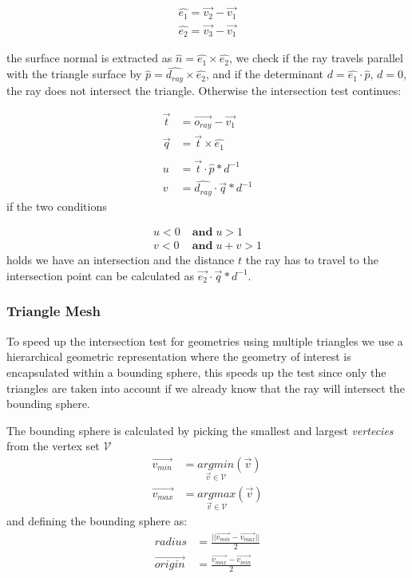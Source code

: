 \documentclass[a4paper, twocolumn]{article}
\begin{document}
\begin{align*}
    \hat{e_1} = \vec{v_2} - \vec{v_1} \\
    \hat{e_2} = \vec{v_3} - \vec{v_1}
\end{align*}

the surface normal is extracted as \( \hat{n} =\hat{e_1} \times \hat{e_2} \), we check if the ray travels parallel with the triangle surface by \(\hat{p} = \hat{d_{ray}} \times \hat{e_2}\), and if the determinant  \(d = \hat{e_1} \cdot \hat{p}\), \(d = 0 \), the ray does not intersect the triangle. Otherwise the intersection test continues:

\begin{align*}
    \vec{t} &= \vec{o_{ray}} - \vec{v_1} \\
    \vec{q} &= \vec{t} \times \hat{e_1} \\\\
    u &= \vec{t} \cdot \hat{p} * d^{-1} \\
    v &= \hat{d_{ray}} \cdot \vec{q} * d^{-1}
\end{align*} 
if the two conditions
 
\begin{align*}
    u < 0 \; &\textbf{and} \; u > 1 \\
    v < 0 \; &\textbf{and}  \; u + v > 1 
\end{align*}
holds we have an intersection and the distance \(t\) the ray has to travel to the intersection point can be calculated as \(\vec{e_2} \cdot \vec{q} * d^{-1} \).

        
        \subsubsection{Triangle Mesh} \label{sec:triangle_mesh}
        
        To speed up the intersection test for geometries using multiple triangles we use a hierarchical geometric representation where the geometry of interest is encapsulated within a bounding sphere, this speeds up the test since only the triangles are taken into account if we already know that the ray will intersect the bounding sphere.

    The bounding sphere is calculated by picking the smallest and largest \textit{vertecies} from the vertex set \(\mathcal{V}\)
    \begin{align*} 
        \vec{v_{min}} &= \underset{\vec{v} \in \mathcal{V}}{argmin}(\vec{v}) \\
        \vec{v_{max}} &= \underset{\vec{v} \in \mathcal{V}}{argmax}(\vec{v})
    \end{align*}
    and defining the bounding sphere as:
    \begin{align*}
        radius &= \frac{ || \vec{v_{min}} - \vec{v_{max}} ||}{2} \\
        \vec{origin} &= \frac{\vec{v_{max}} - \vec{v_{min}}}{2}
    \end{align*}
\end{document}
